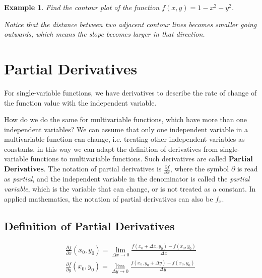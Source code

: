 \documentclass{article}
\newtheorem{example}{Example}
\begin{document}
\begin{example}
  Find the contour plot of the function $f(x, y) = 1 - x^2 - y^2$.


  Notice that the distance between two adjacent contour lines becomes smaller 
  going outwards, which means the slope becomes larger in that direction.

\end{example}

\section{Partial Derivatives}

For single-variable functions, we have derivatives to describe the rate of 
change of the function value with the independent variable.

How do we do the same for multivariable functions, which have more than one 
independent variables? We can assume that only one independent variable in a 
multivariable function can change, i.e. treating other independent variables as 
constants, in this way we can adapt the definition of derivatives from 
single-variable functions to multivariable functions. Such derivatives are 
called \textbf{Partial Derivatives}. The notation of partial derivatives is 
$\frac{\partial f}{\partial x}$, where the symbol $\partial$ is read as 
\emph{partial}, and the independent variable in the denominator is called the 
\emph{partial variable}, which is the variable that can change, or is not 
treated as a constant. In applied mathematics, the notation of partial 
derivatives can also be $f_x$.

\subsection{Definition of Partial Derivatives}

\begin{gather*}
  \frac{\partial f}{\partial x}(x_0, y_0) = \lim_{\Delta x \to 0}\frac{f(x_0 + \Delta x, y_0) - f(x_0, y_0)}{\Delta x} \\
  \frac{\partial f}{\partial y}(x_0, y_0) = \lim_{\Delta y \to 0}\frac{f(x_0, y_0 + \Delta y) - f(x_0, y_0)}{\Delta y} \\
\end{gather*}
\end{document}
